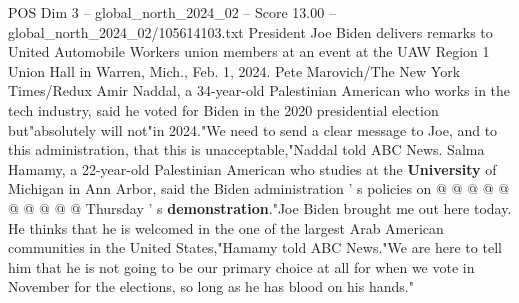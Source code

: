 \begin{textsample}{POS Dim 3 – global\_north\_2024\_02 – Score 13.00 – global\_north\_2024\_02/105614103.txt}
President Joe Biden delivers remarks to United Automobile Workers union members at an event at the UAW Region 1 Union Hall in Warren, Mich., Feb. 1, 2024.
Pete Marovich/The New York Times/Redux Amir Naddal, a 34-year-old Palestinian American who works in the tech industry, said he voted for Biden in the 2020 presidential election but"absolutely will not"in 2024."We need to send a clear message to Joe, and to this administration, that this is unacceptable,"Naddal told ABC News.
Salma Hamamy, a 22-year-old Palestinian American who studies at the \textbf{University} of Michigan in Ann Arbor, said the Biden administration ' s policies on @ @ @ @ @ @ @ @ @ @ Thursday ' s \textbf{demonstration}."Joe Biden brought me out here today.
He thinks that he is welcomed in the one of the largest Arab American communities in the United States,"Hamamy told ABC News."We are here to tell him that he is not going to be our primary choice at all for when we vote in November for the elections, so long as he has blood on his hands."

\end{textsample}
